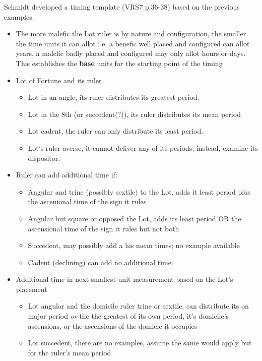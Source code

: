 \begin{mdframed}[backgroundcolor=cyan!05]
\tiny
Schmidt developed a timing template (VRS7 p.36-38) based on the previous examples:

\begin{itemize}[itemsep=1pt, topsep=1pt, partopsep=0pt]
\item The more malefic the Lot ruler is by nature and configuration, the smaller the time units it can allot i.e. a benefic well placed and configured can allot years, a malefic badly placed and configured may only allot hours or days. This establishes the \textbf{base} units for the starting point of the timing
\item Lot of Fortune  and its ruler
\begin{itemize}[itemsep=1pt, topsep=1pt, partopsep=0pt]
\item Lot in an angle, its ruler distributes its greatest period.
\item Lot in the 8th (or succedent(?)), its ruler distributes its mean period
\item Lot cadent, the ruler can only distribute its least period.
\item Lot's ruler averse, it cannot deliver any of its periods; instead, examine its dispositor.
\end{itemize}
\item Ruler can add additional time if:
\begin{itemize}[itemsep=1pt, topsep=1pt, partopsep=0pt]
\item Angular and trine (possibly sextile) to the Lot, adds it least period plus the ascenional time of the sign it rules
\item Angular but square or opposed the Lot, adds its least period OR the ascensional time of the sign it rules but not both
\item Succedent, may possibly add a his mean times; no example available
\item Cadent (declining) can add no additional time.
\end{itemize}
\item Additional time in next smallest unit measurement based on the Lot's placement
\begin{itemize}[itemsep=1pt, topsep=1pt, partopsep=0pt]
\item Lot angular and the domicile ruler trine or sextile, can distribute its on major period \textsl{or} the the greatest of its own period, it's domicile's ascensions, or the ascensions of the domicle it occupies
\item Lot succedent, there are no examples, assume the same would apply but for the ruler's mean period 

\end{itemize}
\end{itemize}
\end{mdframed}
